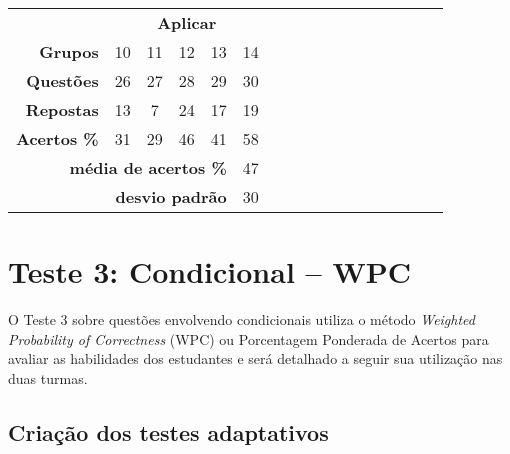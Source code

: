 \begin{table}[!ht]
\begin{tabular}{rccccclllllllllll}
    \multicolumn{1}{|l|}{} & \multicolumn{5}{c|}{\cellcolor{red!25}\textbf{Aplicar}} &  &  &  &  &  &  &  &  &  &  &  \\ \cline{1-6}
    \multicolumn{1}{|r|}{\textbf{Grupos}} & \multicolumn{1}{c|}{10} & \multicolumn{1}{c|}{11} & \multicolumn{1}{c|}{12} & \multicolumn{1}{c|}{13} & \multicolumn{1}{c|}{14} &  &  &  &  &  &  &  &  &  &  &  \\ \cline{1-6}
    \multicolumn{1}{|r|}{\cellcolor[HTML]{D9D9D9}\textbf{Questões}} & \multicolumn{1}{c|}{\cellcolor[HTML]{D9D9D9}26} & \multicolumn{1}{c|}{\cellcolor[HTML]{D9D9D9}27} & \multicolumn{1}{c|}{\cellcolor[HTML]{D9D9D9}28} & \multicolumn{1}{c|}{\cellcolor[HTML]{D9D9D9}29} & \multicolumn{1}{c|}{\cellcolor[HTML]{D9D9D9}30} &  &  &  &  &  &  &  &  &  &  &  \\ 
    \multicolumn{1}{|r|}{\textbf{Repostas}} & \multicolumn{1}{c|}{13} & \multicolumn{1}{c|}{7} & \multicolumn{1}{c|}{24} & \multicolumn{1}{c|}{17} & \multicolumn{1}{c|}{19} &  &  &  &  &  &  &  &  &  &  &  \\ 
    \multicolumn{1}{|r|}{\cellcolor[HTML]{D9D9D9}\textbf{Acertos \%}} & \multicolumn{1}{c|}{\cellcolor[HTML]{D9D9D9}31} & \multicolumn{1}{c|}{\cellcolor[HTML]{D9D9D9}29} & \multicolumn{1}{c|}{\cellcolor[HTML]{D9D9D9}46} & \multicolumn{1}{c|}{\cellcolor[HTML]{D9D9D9}41} & \multicolumn{1}{c|}{\cellcolor[HTML]{D9D9D9}58} &  &  &  &  &  &  &  &  &  &  &  \\ \cline{1-6}
    \multicolumn{5}{r}{\cellcolor[HTML]{F9CB9C}\textbf{média de acertos \%}} & \multicolumn{1}{c}{\cellcolor[HTML]{F9CB9C}47} \\ 
    \multicolumn{5}{r}{\cellcolor[HTML]{F9CB9C}\textbf{desvio padrão}} & \multicolumn{1}{c}{\cellcolor[HTML]{F9CB9C}30} \\ 
    \end{tabular}
    \end{table}


\section{Teste 3: Condicional -- WPC}

O Teste 3 sobre questões envolvendo condicionais utiliza o método \textit{Weighted Probability of Correctness} (WPC) ou Porcentagem Ponderada de Acertos para avaliar as habilidades dos estudantes e será detalhado a seguir sua utilização nas duas turmas.

\subsection{Criação dos testes adaptativos}

